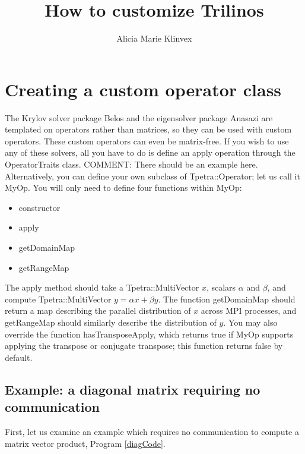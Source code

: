 \documentclass[pdf,12pt,report,strict]{SANDreport}
\title{How to customize Trilinos}
\author{Alicia Marie Klinvex}
\newcommand{\COMMENT}[1]{{\color{red} COMMENT: #1}}
\begin{document}
\maketitle



\renewcommand{\lstlistingname}{Program}

\SANDmain

\chapter{Creating a custom operator class} 
The Krylov solver package Belos and the eigensolver package Anasazi are
templated on operators rather than matrices, so they can be used with custom
operators.  These custom operators can even be matrix-free. If you wish to use
any of these solvers, all you have to do is define an apply operation through
the OperatorTraits class.
\COMMENT{There should be an example here.}
Alternatively, you can define your own subclass of Tpetra::Operator; let us
call it MyOp.  You will only need to define four functions within MyOp:
\begin{itemize}
  \item constructor
  \item apply
  \item getDomainMap
  \item getRangeMap
\end{itemize}
The apply method should take a Tpetra::MultiVector $x$, scalars $\alpha$ and
$\beta$, and compute Tpetra::MultiVector $y = \alpha x + \beta y$.  The function
getDomainMap should return a map describing the parallel distribution of $x$
across MPI processes, and getRangeMap should similarly describe the distribution
of $y$.  You may also override the function hasTransposeApply, which returns
true if MyOp supports applying the transpose or conjugate transpose; this
function returns false by default. 

\section{Example: a diagonal matrix requiring no communication}
First, let us examine an example which requires no communication to compute a
matrix vector product, Program \ref{diagCode}.
\end{document}
